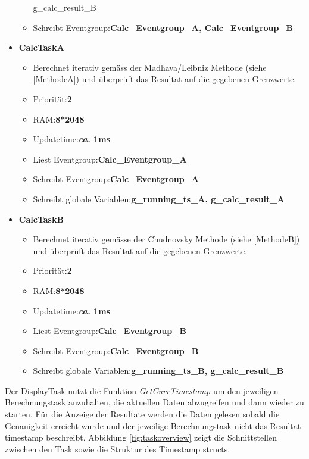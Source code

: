 \documentclass[ngerman,10pt,a4paper,titlepage]{report}
\begin{document}
\begin{itemize}
\begin{itemize}
{				\tabto{5cm}g\_calc\_result\_B}
			\item Schreibt Eventgroup:\tabto{5cm}\textbf{Calc\_Eventgroup\_A, Calc\_Eventgroup\_B}
		\end{itemize}
		\item {\large \textbf{CalcTaskA}}
		\begin{itemize}
			\item Berechnet iterativ gemäss der Madhava/Leibniz Methode (siehe \ref{MethodeA}) und überprüft das Resultat auf die gegebenen Grenzwerte.
			\item Priorität:\tabto{5cm}\textbf{2}
			\item RAM:\tabto{5cm}\textbf{8*2048}
			\item Updatetime:\tabto{5cm}\textbf{\textit{ca.} 1ms}
			\item Liest Eventgroup:\tabto{5cm}\textbf{Calc\_Eventgroup\_A}
			\item Schreibt Eventgroup:\tabto{5cm}\textbf{Calc\_Eventgroup\_A}
			\item Schreibt globale Variablen:\tabto{5cm}\textbf{g\_running\_ts\_A, g\_calc\_result\_A}
		\end{itemize}
		\item {\large \textbf{CalcTaskB}}
		\begin{itemize}
			\item Berechnet iterativ gemässe der Chudnovsky Methode (siehe \ref{MethodeB}) und überprüft das Resultat auf die gegebenen Grenzwerte.
			\item Priorität:\tabto{5cm}\textbf{2}
			\item RAM:\tabto{5cm}\textbf{8*2048}
			\item Updatetime:\tabto{5cm}\textbf{\textit{ca.} 1ms}
			\item Liest Eventgroup:\tabto{5cm}\textbf{Calc\_Eventgroup\_B}
			\item Schreibt Eventgroup:\tabto{5cm}\textbf{Calc\_Eventgroup\_B}
			\item Schreibt globale Variablen:\tabto{5cm}\textbf{g\_running\_ts\_B, g\_calc\_result\_B}
		\end{itemize}
	\end{itemize}
	\doublespacing
	Der DisplayTask nutzt die Funktion \textit{GetCurrTimestamp} um den jeweiligen Berechnungstask anzuhalten, die aktuellen Daten abzugreifen und dann wieder zu starten. Für die Anzeige der Resultate werden die Daten gelesen sobald die Genauigkeit erreicht wurde und der jeweilige Berechnungstask nicht das Resultat timestamp beschreibt. Abbildung \ref{fig:taskoverview} zeigt die Schnittstellen zwischen den Task sowie die Struktur des Timestamp structs.%
\end{document}
